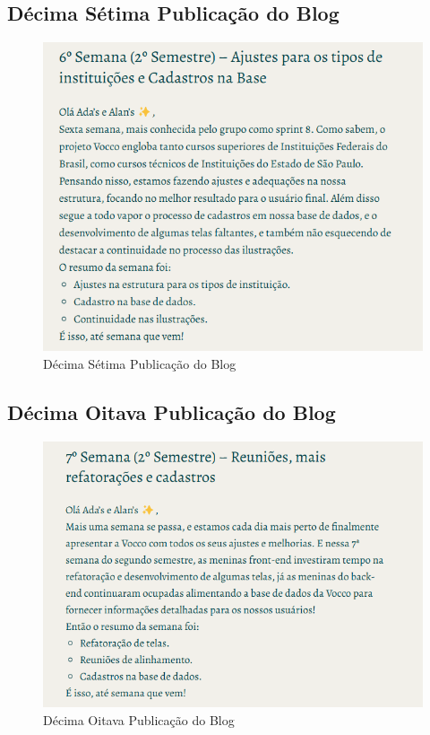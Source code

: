 \begin{apendicesenv}
\subsection*{Décima Sétima Publicação do Blog}
\begin{figure}[H]
    \centering
    \includegraphics[width=1.0\linewidth]{images/post17.png}
    \caption{Décima Sétima Publicação do Blog}
    \label{fig:decima primeira}
\end{figure}

\subsection*{Décima Oitava Publicação do Blog}
\begin{figure}[H]
    \centering
    \includegraphics[width=1.0\linewidth]{images/post18.png}
    \caption{Décima Oitava Publicação do Blog}
    \label{fig:decima primeira}
\end{figure}


\end{apendicesenv}
